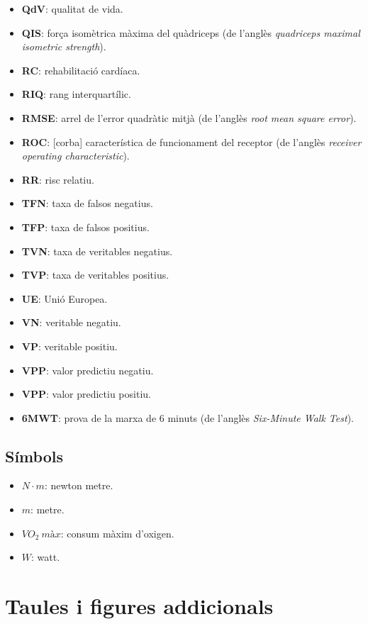 \documentclass[CAT]{TFUOC}%
\providecommand{\tightlist}{\setlength{\itemsep}{0pt}\setlength{\parskip}{0pt}}
\begin{document}
\begin{itemize}
\item
  \textbf{QdV}: qualitat de vida.
\item
  \textbf{QIS}: força isomètrica màxima del quàdriceps (de l'anglès \emph{quadriceps maximal isometric strength}).
\item
  \textbf{RC}: rehabilitació cardíaca.
\item
  \textbf{RIQ}: rang interquartílic.
\item
  \textbf{RMSE}: arrel de l'error quadràtic mitjà (de l'anglès \emph{root mean square error}).
\item
  \textbf{ROC}: {[}corba{]} característica de funcionament del receptor (de l'anglès \emph{receiver operating characteristic}).
\item
  \textbf{RR}: risc relatiu.
\item
  \textbf{TFN}: taxa de falsos negatius.
\item
  \textbf{TFP}: taxa de falsos positius.
\item
  \textbf{TVN}: taxa de veritables negatius.
\item
  \textbf{TVP}: taxa de veritables positius.
\item
  \textbf{UE}: Unió Europea.
\item
  \textbf{VN}: veritable negatiu.
\item
  \textbf{VP}: veritable positiu.
\item
  \textbf{VPP}: valor predictiu negatiu.
\item
  \textbf{VPP}: valor predictiu positiu.
\item
  \textbf{6MWT}: prova de la marxa de 6 minuts (de l'anglès \emph{Six-Minute Walk Test}).
\end{itemize}

\section{Símbols}\label{suxedmbols}

\begin{itemize}
\tightlist
\item
  \(N \cdot m\): newton metre.
\item
  \(m\): metre.
\item
  \(VO_2\ màx\): consum màxim d'oxigen.
\item
  \(W\): watt.
\end{itemize}

\chapter{Taules i figures addicionals}\label{taules-i-figures-addicionals}
\end{document}
